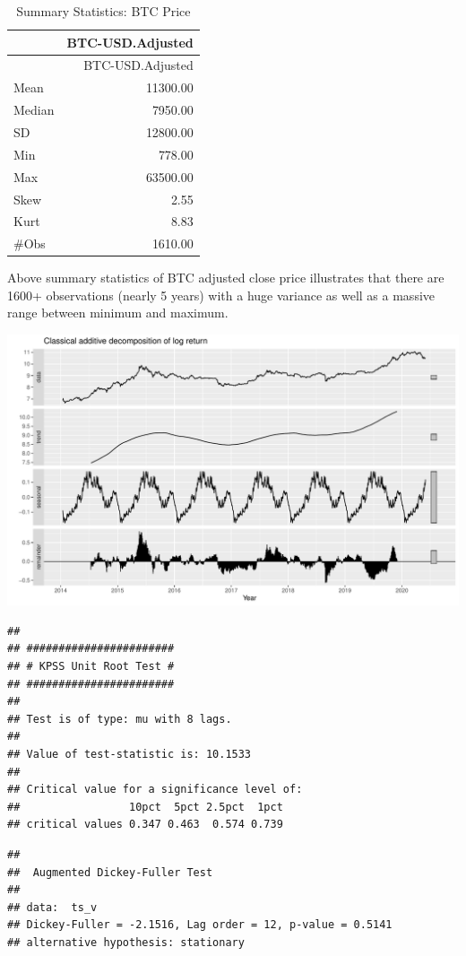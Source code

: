 \documentclass[
  11pt,
]{article}
\begin{document}
\begin{longtable}[]{@{}lr@{}}
\caption{Summary Statistics: BTC Price}\tabularnewline
\toprule
& BTC-USD.Adjusted \\
\midrule
\endfirsthead
\toprule
& BTC-USD.Adjusted \\
\midrule
\endhead
Mean & 11300.00 \\
Median & 7950.00 \\
SD & 12800.00 \\
Min & 778.00 \\
Max & 63500.00 \\
Skew & 2.55 \\
Kurt & 8.83 \\
\#Obs & 1610.00 \\
\bottomrule
\end{longtable}

Above summary statistics of BTC adjusted close price illustrates that
there are 1600+ observations (nearly 5 years) with a huge variance as
well as a massive range between minimum and maximum.

\includegraphics{ST436_Project_files/figure-latex/unnamed-chunk-12-1.pdf}

\begin{verbatim}
## 
## ####################### 
## # KPSS Unit Root Test # 
## ####################### 
## 
## Test is of type: mu with 8 lags. 
## 
## Value of test-statistic is: 10.1533 
## 
## Critical value for a significance level of: 
##                 10pct  5pct 2.5pct  1pct
## critical values 0.347 0.463  0.574 0.739
\end{verbatim}

\begin{verbatim}
## 
##  Augmented Dickey-Fuller Test
## 
## data:  ts_v
## Dickey-Fuller = -2.1516, Lag order = 12, p-value = 0.5141
## alternative hypothesis: stationary
\end{verbatim}
\end{document}
